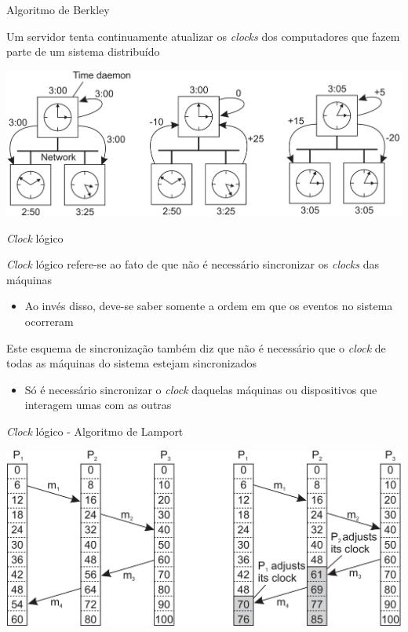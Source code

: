 \documentclass[compress]{beamer}
\begin{document}
\begin{frame}{Algoritmo de Berkley}

Um servidor tenta continuamente atualizar os \textit{clocks} dos computadores que fazem parte de um sistema distribuído

\vspace{1cm}
 
\centering \includegraphics[width=\textwidth]{images/berkeley.png}

\end{frame}


\begin{frame}{\textit{Clock} lógico}

\textit{Clock} lógico refere-se ao fato de que não é necessário sincronizar os \textit{clocks} das máquinas
\begin{itemize}
    \item Ao invés disso, deve-se saber somente a ordem em que os eventos no sistema ocorreram
\end{itemize}

\vspace{0.5cm}

Este esquema de sincronização também diz que não é necessário que o \textit{clock} de todas as máquinas do sistema estejam sincronizados
\begin{itemize}
    \item Só é necessário sincronizar o \textit{clock} daquelas máquinas ou dispositivos que interagem umas com as outras
\end{itemize}

\end{frame}


\begin{frame}{\textit{Clock} lógico - Algoritmo de Lamport}

\centering \includegraphics[width=\textwidth]{images/lamport.png}

\end{frame}
\end{document}
